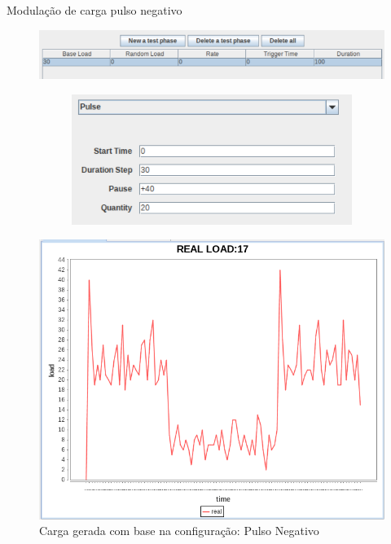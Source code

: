 \begin{frame}{Modulação de carga pulso negativo}
	\begin{figure}
		\centering
		\includegraphics[scale=0.43]{../monograph/images/condiguracao-carga-bench4q2.png}
	\end{figure}
	\begin{figure}
		\centering
		\begin{minipage}{.35\textwidth}
			\begin{figure}
				\centering
				\includegraphics[scale=0.37]{../monograph/images/condiguracao-carga-modulada2.png}
			\end{figure}
		\end{minipage}
		\begin{minipage}{.45\textwidth}
			\includegraphics[scale=0.35]{../monograph/images/grafico-carga-modulada2.png}			
		\end{minipage}
		\caption{Carga gerada com base na configuração: Pulso Negativo}
	\end{figure}
\end{frame}

